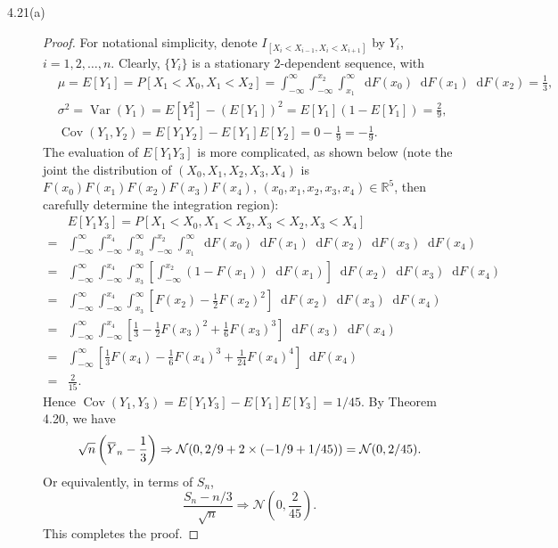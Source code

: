 \documentclass{article}
\newcommand{\real}{\mathbb{R}}
\newcommand{\dd}{\mathop{}\!\mathrm{d}}
\newcommand{\overbar}[1]{\mkern 1.5mu\overline{\mkern-1.5mu#1\mkern-1.5mu}\mkern 1.5mu}
\newcommand{\gaussian}{\mathcal{N}}
\DeclareMathOperator*{\Var}{Var}
\DeclareMathOperator*{\Cov}{Cov}
\theoremstyle{definition}
\theoremstyle{plain}
\theoremstyle{remark}
\begin{document}
\begin{description}
\item[4.21(a)]
\begin{proof}
For notational simplicity, denote $I_{[X_i < X_{i - 1}, X_i < X_{i + 1}]}$ by $Y_i$,
$i = 1, 2, \ldots, n$. Clearly, $\{Y_i\}$ is a stationary $2$-dependent sequence, 
with
\begin{align*}
    & \mu = E[Y_1] = P[X_1 < X_0, X_1 < X_2] = 
    \int_{-\infty}^\infty\int_{-\infty}^{x_2}\int_{x_1}^\infty \dd F(x_0) 
    \dd F(x_1) \dd F(x_2) = \frac{1}{3}, \\
    & \sigma^2 = \Var(Y_1) = E[Y_1^2] - (E[Y_1])^2 = E[Y_1](1 - E[Y_1]) 
    = \frac{2}{9}, \\
    & \Cov(Y_1, Y_2) = E[Y_1Y_2] - E[Y_1]E[Y_2] = 0 - \frac{1}{9} = -\frac{1}{9}.
\end{align*}
The evaluation of $E[Y_1Y_3]$ is more complicated, as shown below (note the 
joint the distribution of $(X_0, X_1, X_2, X_3, X_4)$ is $F(x_0)F(x_1)F(x_2)F(x_3)
F(x_4)$, $(x_0, x_1, x_2, x_3, x_4) \in \real^5$, then carefully determine the integration
region): 
\begin{align*}
    & E[Y_1Y_3] = P[X_1 < X_0, X_1 < X_2, X_3 < X_2, X_3 < X_4] \\
  = & \int_{-\infty}^\infty\int_{-\infty}^{x_4}\int_{x_3}^\infty\int_{-\infty}^{x_2}
  \int_{x_1}^\infty \dd F(x_0) \dd F(x_1) \dd F(x_2) \dd F(x_3) \dd F(x_4) \\
  = & \int_{-\infty}^\infty\int_{-\infty}^{x_4}\int_{x_3}^\infty\left[\int_{-\infty}^{x_2}
  (1 - F(x_1)) \dd F(x_1)\right]\dd F(x_2) \dd F(x_3) \dd F(x_4) \\
  = & \int_{-\infty}^\infty \int_{-\infty}^{x_4} \int_{x_3}^\infty 
  \left[F(x_2) - \frac{1}{2}F(x_2)^2\right] \dd F(x_2) \dd F(x_3) \dd F(x_4) \\
  = & \int_{-\infty}^\infty \int_{-\infty}^{x_4} 
  \left[\frac{1}{3} - \frac{1}{2} F(x_3)^2 + \frac{1}{6} F(x_3)^3\right] \dd F(x_3) \dd 
  F(x_4) \\
  = & \int_{-\infty}^\infty\left[\frac{1}{3}F(x_4) - \frac{1}{6}F(x_4)^3 + 
  \frac{1}{24}F(x_4)^4\right] \dd F(x_4) \\
  = & \frac{2}{15}.
\end{align*}
Hence $\Cov(Y_1, Y_3) = E[Y_1Y_3] - E[Y_1]E[Y_3] = 1/45$. By Theorem 4.20, we have
\begin{equation*}
    \sqrt{n}\left(\overbar{Y}_n - \frac{1}{3}\right) \Rightarrow 
    \gaussian(0, 2/9 + 2 \times (- 1/9 + 1/45)) = \gaussian(0, 2/45).
\end{equation*}
Or equivalently, in terms of $S_n$, 
\begin{equation*}
    \frac{S_n - n/3}{\sqrt{n}} \Rightarrow \gaussian\left(0, \frac{2}{45}\right).
\end{equation*}
This completes the proof. 
\end{proof}
\end{description}
\end{document}
